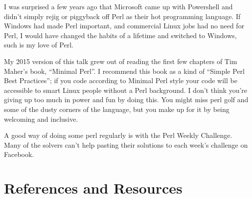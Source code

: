 \documentclass{article}
\begin{document}
I was surprised a few years ago that Microsoft came up with Powershell
and didn't simply rejig or piggyback off Perl as their hot programming
language. If Windows had made Perl important, and commercial Linux
jobs had no need for Perl, I would have changed the habits of a
lifetime and switched to Windows, such is my love of Perl.

My 2015 version of this talk grew out of reading the first few
chapters of Tim Maher's book, ``Minimal Perl''. I recommend this book
as a kind of ``Simple Perl Best Practices''; if you code according to
Minimal Perl style your code will be accessible to smart Linux people
without a Perl background. I don't think you're giving up too much in
power and fun by doing this. You might miss perl golf and some of
the dusty corners of the language, but you make up for it by being
welcoming and inclusive.

A good way of doing some perl regularly is with the Perl Weekly
Challenge. Many of the solvers can't help pasting their solutions to
each week's challenge on Facebook.

\section*{References and Resources}
\end{document}
